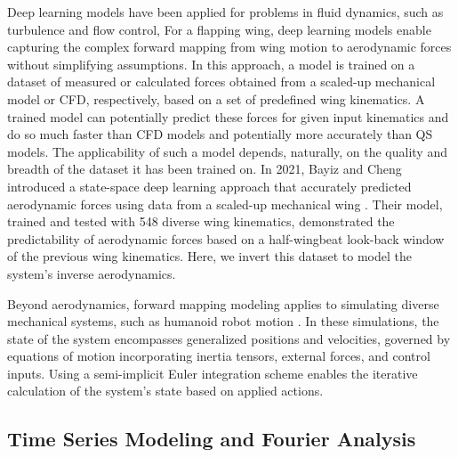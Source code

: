 Deep learning models have been applied for problems in fluid dynamics, such as turbulence and flow control\cite{Ling2016Reynolds, brunton2016discovering, duraisamy2019turbulence}, 
For a flapping wing, deep learning models enable capturing the complex forward mapping from wing motion to aerodynamic forces without simplifying assumptions. In this approach, a model is trained on a dataset of measured or calculated forces obtained from a scaled-up mechanical model or CFD, respectively, based on a set of predefined wing kinematics. A trained model can potentially predict these forces for given input kinematics and do so much faster than CFD models and potentially more accurately than QS models. The applicability of such a model depends, naturally, on the quality and breadth of the dataset it has been trained on.
In 2021, Bayiz and Cheng introduced a state-space deep learning approach that accurately predicted aerodynamic forces using data from a scaled-up mechanical wing \cite{Bayiz_Cheng_2021}. Their model, trained and tested with 548 diverse wing kinematics, demonstrated the predictability of aerodynamic forces based on a half-wingbeat look-back window of the previous wing kinematics. Here, we invert this dataset to model the system's inverse aerodynamics.

Beyond aerodynamics, forward mapping modeling applies to simulating diverse mechanical systems, such as humanoid robot motion \cite{humanoid_gym_env}. In these simulations, the state of the system encompasses generalized positions and velocities, governed by equations of motion incorporating inertia tensors, external forces, and control inputs. Using a semi-implicit Euler integration scheme enables the iterative calculation of the system's state based on applied actions. %

\subsection{Time Series Modeling and Fourier Analysis}

